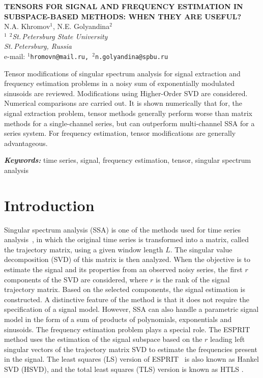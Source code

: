 \documentclass[12pt]{article}
\providecommand{\keywords}[1]
{
  \vspace{2mm}\hspace{20pt}\textbf{\textit{Keywords:}} #1
}
\providecommand{\abskeyw}[2]
{
  \begin{small}
    \begin{adjustwidth}{10mm}{10mm}
      \vspace{1mm}\hspace{20pt}#1

      \keywords{#2}
    \end{adjustwidth}
  \end{small}
}
\theoremstyle{definition}
\begin{document}
\begin{center}
  {\Large\bf TENSORS FOR SIGNAL AND FREQUENCY ESTIMATION IN
  SUBSPACE-BASED METHODS: WHEN THEY ARE USEFUL?}\\\vspace{2mm} {\sc N.A.
  Khromov$^1$, N.E. Golyandina$^2$}\\\vspace{2mm}
  {\it $^{1}$ $^{2}$St.\,Petersburg State University\\
  St.\,Petersburg, Russia\\} e-mail: {\tt $^1$hromovn@mail.ru,
  $^2$n.golyandina@spbu.ru}

  \abskeyw{Tensor modifications of singular spectrum analysis for  signal extraction and frequency estimation problems in a noisy sum  of exponentially modulated sinusoids are reviewed. Modifications using Higher-Order SVD are considered. Numerical comparisons are  carried out. It is shown numerically that for, the signal extraction problem, tensor methods generally perform worse than matrix methods for a single-channel series, but can outperform multi-channel SSA for a series system. For frequency estimation, tensor modifications are generally advantageous.}{time series,
  signal, frequency estimation, tensor, singular spectrum analysis}
\end{center}

\section{Introduction}

Singular spectrum analysis (SSA) is one of the methods used for time series analysis~\cite{Golyandina2001}, in which the original time series is transformed into a matrix, called the trajectory matrix, using a given window length $L$. The singular value decomposition (SVD) of this matrix is then analyzed. When the objective is to estimate the signal and its properties from an observed noisy series, the first $r$ components of the SVD are considered, where $r$ is the rank of the signal trajectory matrix. Based on the selected components, the signal estimation is constructed. A distinctive feature of the method is that it does not require the specification of a signal model. However, SSA can also handle a parametric signal model in the form of a sum of products of polynomials, exponentials and sinusoids. The frequency estimation problem plays a special role. The ESPRIT method uses the estimation of the signal subspace based on the $r$ leading left singular vectors of the trajectory matrix SVD to estimate the frequencies present in the signal.
The least squares (LS) version of ESPRIT~\cite{Roy1989} is also known as Hankel SVD (HSVD), and the total least squares (TLS) version is known as HTLS \cite{VanHuffel1994}.
\end{document}
